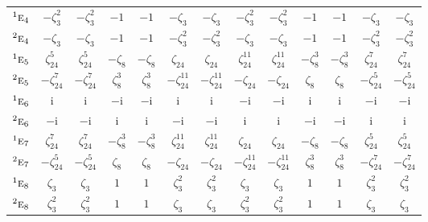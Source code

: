 \documentclass[10pt,a4paper]{article}
\numberwithin{equation}{section}
\newcommand{\irr}[1]{\text{\normalfont\scshape #1}}
\newcommand{\conjpair}[1]{{}^{#1}}
\newcommand{\iunit}{\mathrm{i}}
\newcommand{\rootunity}[1]{\zeta_{#1}}
\begin{document}
{\begin{longtable}{@{}lcccccccccccc@{}}
$\conjpair{1}\irr{e}_{4}$ & $-\rootunity{3}^{2}$ & $-\rootunity{3}^{2}$ & $-1$ & $-1$ & $-\rootunity{3}$ & $-\rootunity{3}$ & $-\rootunity{3}^{2}$ & $-\rootunity{3}^{2}$ & $-1$ & $-1$ & $-\rootunity{3}$ & $-\rootunity{3}$\\
$\conjpair{2}\irr{e}_{4}$ & $-\rootunity{3}$ & $-\rootunity{3}$ & $-1$ & $-1$ & $-\rootunity{3}^{2}$ & $-\rootunity{3}^{2}$ & $-\rootunity{3}$ & $-\rootunity{3}$ & $-1$ & $-1$ & $-\rootunity{3}^{2}$ & $-\rootunity{3}^{2}$\\
$\conjpair{1}\irr{e}_{5}$ & $\rootunity{24}^{5}$ & $\rootunity{24}^{5}$ & $-\rootunity{8}$ & $-\rootunity{8}$ & $\rootunity{24}$ & $\rootunity{24}$ & $\rootunity{24}^{11}$ & $\rootunity{24}^{11}$ & $-\rootunity{8}^{3}$ & $-\rootunity{8}^{3}$ & $\rootunity{24}^{7}$ & $\rootunity{24}^{7}$\\
$\conjpair{2}\irr{e}_{5}$ & $-\rootunity{24}^{7}$ & $-\rootunity{24}^{7}$ & $\rootunity{8}^{3}$ & $\rootunity{8}^{3}$ & $-\rootunity{24}^{11}$ & $-\rootunity{24}^{11}$ & $-\rootunity{24}$ & $-\rootunity{24}$ & $\rootunity{8}$ & $\rootunity{8}$ & $-\rootunity{24}^{5}$ & $-\rootunity{24}^{5}$\\
$\conjpair{1}\irr{e}_{6}$ & $\iunit{}$ & $\iunit{}$ & $-\iunit{}$ & $-\iunit{}$ & $\iunit{}$ & $\iunit{}$ & $-\iunit{}$ & $-\iunit{}$ & $\iunit{}$ & $\iunit{}$ & $-\iunit{}$ & $-\iunit{}$\\
$\conjpair{2}\irr{e}_{6}$ & $-\iunit{}$ & $-\iunit{}$ & $\iunit{}$ & $\iunit{}$ & $-\iunit{}$ & $-\iunit{}$ & $\iunit{}$ & $\iunit{}$ & $-\iunit{}$ & $-\iunit{}$ & $\iunit{}$ & $\iunit{}$\\
$\conjpair{1}\irr{e}_{7}$ & $\rootunity{24}^{7}$ & $\rootunity{24}^{7}$ & $-\rootunity{8}^{3}$ & $-\rootunity{8}^{3}$ & $\rootunity{24}^{11}$ & $\rootunity{24}^{11}$ & $\rootunity{24}$ & $\rootunity{24}$ & $-\rootunity{8}$ & $-\rootunity{8}$ & $\rootunity{24}^{5}$ & $\rootunity{24}^{5}$\\
$\conjpair{2}\irr{e}_{7}$ & $-\rootunity{24}^{5}$ & $-\rootunity{24}^{5}$ & $\rootunity{8}$ & $\rootunity{8}$ & $-\rootunity{24}$ & $-\rootunity{24}$ & $-\rootunity{24}^{11}$ & $-\rootunity{24}^{11}$ & $\rootunity{8}^{3}$ & $\rootunity{8}^{3}$ & $-\rootunity{24}^{7}$ & $-\rootunity{24}^{7}$\\
$\conjpair{1}\irr{e}_{8}$ & $\rootunity{3}$ & $\rootunity{3}$ & $1$ & $1$ & $\rootunity{3}^{2}$ & $\rootunity{3}^{2}$ & $\rootunity{3}$ & $\rootunity{3}$ & $1$ & $1$ & $\rootunity{3}^{2}$ & $\rootunity{3}^{2}$\\
$\conjpair{2}\irr{e}_{8}$ & $\rootunity{3}^{2}$ & $\rootunity{3}^{2}$ & $1$ & $1$ & $\rootunity{3}$ & $\rootunity{3}$ & $\rootunity{3}^{2}$ & $\rootunity{3}^{2}$ & $1$ & $1$ & $\rootunity{3}$ & $\rootunity{3}$\\

\end{longtable}}
\end{document}
